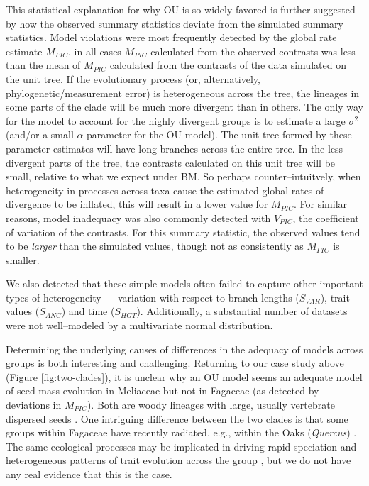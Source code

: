 \documentclass[a4paper,12pt]{article}
\begin{document}
This statistical explanation for why OU is so widely favored is further suggested by how the observed summary statistics deviate from the simulated summary statistics. Model violations were most frequently detected by the global rate estimate $M_{PIC}$, in all cases $M_{PIC}$ calculated from the observed contrasts was less than the mean of $M_{PIC}$ calculated from the contrasts of the data simulated on the unit tree. If the evolutionary process (or, alternatively, phylogenetic/measurement error) is heterogeneous across the tree, the lineages in some parts of the clade will be much more divergent than in others. The only way for the model to account for the highly divergent groups is to estimate a large $\sigma^2$ (and/or a small $\alpha$ parameter for the OU model). The unit tree formed by these parameter estimates will have long branches across the entire tree. In the less divergent parts of the tree, the contrasts calculated on this unit tree will be small, relative to what we expect under BM. So perhaps counter--intuitvely, when heterogeneity in processes across taxa cause the estimated global rates of divergence to be inflated, this will result in a lower value for $M_{PIC}$. For similar reasons, model inadequacy was also commonly detected with $V_{PIC}$, the coefficient of variation of the contrasts. For this summary statistic, the observed values tend to be \emph{larger} than the simulated values, though not as consistently as $M_{PIC}$ is smaller. 

We also detected that these simple models often failed to capture other important types of heterogeneity --- variation with respect to branch lengths ($S_{VAR}$), trait values ($S_{ANC}$) and time ($S_{HGT}$). Additionally, a substantial number of datasets were not well--modeled by a multivariate normal distribution.

Determining the underlying causes of differences in the adequacy of models across groups is both interesting and challenging. Returning to our case study above (Figure \ref{fig:two-clades}), it is unclear why an OU model seems an adequate model of seed mass evolution in Meliaceae but not in Fagaceae (as detected by deviations in $M_{PIC}$). Both are woody lineages with large, usually vertebrate dispersed seeds \citep{Pannell1987, Manos2001}. One intriguing difference between the two clades is that some groups within Fagaceae have recently radiated, e.g., within the Oaks (\emph{Quercus}) \citep{Simeone2013}. The same ecological processes may be implicated in driving rapid speciation and heterogeneous patterns of trait evolution across the group \citep{Schluter2000}, but we do not have any real evidence that this is the case. 
\end{document}
